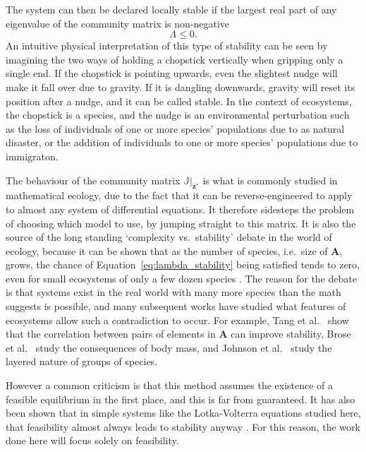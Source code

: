 The system can then be declared locally stable if the largest real part of any eigenvalue of the community matrix is non-negative
\begin{equation}
    \Lambda \leq 0.
    \label{eq:lambda_stability}
\end{equation}
An intuitive physical interpretation of this type of stability can be seen by imagining the two ways of holding a chopstick vertically when gripping only a single end. If the chopstick is pointing upwards, even the slightest nudge will make it fall over due to gravity. If it is dangling downwards, gravity will reset its position after a nudge, and it can be called stable.
In the context of ecosystems, the chopstick is a species, and the nudge is an environmental perturbation such as the loss of individuals of one or more species' populations due to as natural disaster, or the addition of individuals to one or more species' populations due to immigraton.

The behaviour of the community matrix $\mathbb{J}|_\mathbf{z^*}$ is what is commonly studied in mathematical ecology, due to the fact that it can be reverse-engineered to apply to almost any system of differential equations. It therefore sidesteps the problem of choosing which model to use, by jumping straight to this matrix.
It is also the source of the long standing `complexity vs.\ stability' debate in the world of ecology, because it can be shown that as the number of species, i.e.\ size of $\mathbf{A}$, grows, the chance of Equation~\eqref{eq:lambda_stability} being satisfied tends to zero, even for small ecosystems of only a few dozen species \cite{May1973}.
The reason for the debate is that systems exist in the real world with many more species than the math suggests is possible, and many subsequent works have studied what features of ecosystems allow such a contradiction to occur.
For example, Tang et al.\ \cite{Tang2014Correlation} show that the correlation between pairs of elements in $\mathbf{A}$ can improve stability, Brose et al.\ \cite{Brose2006} study the consequences of body mass, and Johnson et al.\ \cite{Johnson2014} study the layered nature of groups of species.

However a common criticism is that this method assumes the existence of a feasible equilibrium in the first place, and this is far from guaranteed. It has also been shown that in simple systems like the Lotka-Volterra equations studied here, that feasibility almost always leads to stability anyway \cite{Dougoud2018}. For this reason, the work done here will focus solely on feasibility.

